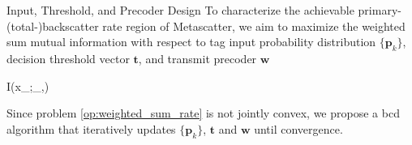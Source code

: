 \documentclass[journal]{IEEEtran}
\begin{document}
\begin{section}{Input, Threshold, and Precoder Design}
	To characterize the achievable primary-(total-)backscatter rate region of Metascatter, we aim to maximize the weighted sum mutual information with respect to tag input probability distribution $\{\boldsymbol{p}_k\}$, decision threshold vector $\boldsymbol{t}$, and transmit precoder $\boldsymbol{w}$
	\begin{maxi!}
		{}{I(x_{};_{},)}{\label{op:weighted_sum_rate}}{\label{ob:weighted_sum_rate}}
	\end{maxi!}
	Since problem \eqref{op:weighted_sum_rate} is not jointly convex, we propose a \gls{bcd} algorithm that iteratively updates $\{\boldsymbol{p}_k\}$, $\boldsymbol{t}$ and $\boldsymbol{w}$ until convergence.


\end{section}
\end{document}
